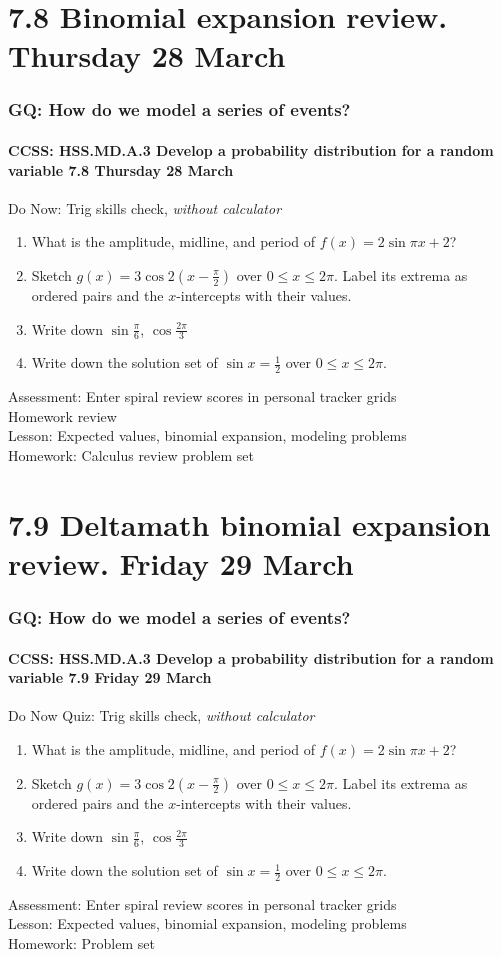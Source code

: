 \documentclass{beamer}
\begin{document}
\section{7.8 Binomial expansion review. Thursday 28 March}
  \frame
  {
    \frametitle{GQ: How do we model a series of events?}
    \framesubtitle{CCSS: HSS.MD.A.3 Develop a probability distribution for a random variable \hfill \alert{7.8 Thursday 28 March}}

    \begin{block}{Do Now: Trig skills check, \emph{without calculator}}
    \begin{enumerate}
        \item What is the amplitude, midline, and period of $f(x)=2\sin \pi x+2$?
        \item Sketch $g(x)=3\cos 2(x- \frac{\pi}{2})$ over $0 \leq x \leq 2 \pi$. Label its extrema as ordered pairs and the $x$-intercepts with their values.
        \item Write down $\sin \frac{\pi}{6}$, $\cos \frac{2\pi}{3}$
        \item Write down the solution set of $\sin x = \frac{1}{2}$ over $0 \leq x \leq 2 \pi$.
    \end{enumerate}
    \end{block}
    Assessment: Enter spiral review scores in personal tracker grids\\
    Homework review\\
    Lesson: Expected values, binomial expansion, modeling problems\\
    Homework: Calculus review problem set
  }

\section{7.9 Deltamath binomial expansion review. Friday 29 March}
  \frame
  {
    \frametitle{GQ: How do we model a series of events?}
    \framesubtitle{CCSS: HSS.MD.A.3 Develop a probability distribution for a random variable \hfill \alert{7.9 Friday 29 March}}

    \begin{block}{Do Now Quiz: Trig skills check, \emph{without calculator}}
    \begin{enumerate}
      \item What is the amplitude, midline, and period of $f(x)=2\sin \pi x+2$?
      \item Sketch $g(x)=3\cos 2(x- \frac{\pi}{2})$ over $0 \leq x \leq 2 \pi$. Label its extrema as ordered pairs and the $x$-intercepts with their values.
      \item Write down $\sin \frac{\pi}{6}$, $\cos \frac{2\pi}{3}$
      \item Write down the solution set of $\sin x = \frac{1}{2}$ over $0 \leq x \leq 2 \pi$.
    \end{enumerate}
    \end{block}
    Assessment: Enter spiral review scores in personal tracker grids\\
    Lesson: Expected values, binomial expansion, modeling problems\\
    Homework: Problem set
  }
\end{document}
